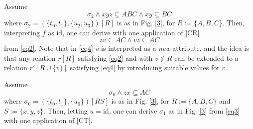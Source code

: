 \documentclass[envcountset]{llncs}
\newcommand{\si}{\sigma}
\newcommand{\sub}{\subseteq}
\newcommand{\ja}{\wedge}
\newcommand{\id}{\mathrm{id}}
\begin{document}
\begin{ex}
 Assume 
\begin{equation}\label{eq2}
\si_2 \ja   xyz \sub ABC\ja  xy \sub BC
\end{equation}
where $\si_2= (\{t_0,t_1\},\{u_2,u_3\})[R]$ is as in Fig. \ref{3}, for $R:=\{A,B,C\}$. Then, interpreting $f$ as $\id$, one can derive with one application of [CR]   \begin{equation}\label{eq4}
zv \sub AC \ja vz \sub AC
\end{equation}
 from \eqref{eq2}. Note that in \eqref{eq4} $v$ is interpreted as a \emph{new} attribute, and the idea is that any relation $r[R]$  satisfying \eqref{eq2} and with  $v\not\in R$ can be extended to a relation $r'[R\cup\{v\}]$ satisfying \eqref{eq4}  by introducing  suitable values for $v$.
\end{ex}


\begin{ex}
Assume
\begin{equation}\label{eq3}
\si_0 \ja zx\sub AC
\end{equation}
where $\si_0= (\{t_0,t_1\},\{u_0\})[RS]$ is as in Fig. \ref{3}, for $R:=\{A,B,C\}$ and $S:=\{x,y,z\}$.
Then, letting $u=\id$, one can derive $\si_1$ as in Fig. \ref{3} from  \eqref{eq3} with one application of [CT].





\end{ex}
\end{document}
